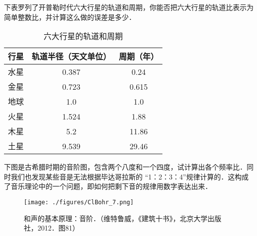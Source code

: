 \begin{exercise}{}
下表罗列了开普勒时代六大行星的轨道和周期，你能否把六大行星的轨道比表示为简单整数比，并计算这么做的误差是多少．

\begin{table}[ht]
\centering
\caption{六大行星的轨道和周期}\label{ClBohr_tab2}
\begin{tabular}{|c|c|c|}
\hline
行星 & 轨道半径（天文单位） & 周期（年） \\
\hline
水星 & 0.387 & 0.24  \\
\hline
金星 & 0.723 & 0.615 \\
\hline
地球 & 1.0 & 1.0 \\
\hline
火星 & 1.524 & 1.88 \\
\hline
木星 & 5.2 & 11.86 \\
\hline
土星 & 9.539 & 29.46 \\
\hline
\end{tabular}
\end{table}
\end{exercise}

\begin{exercise}{}
下图是古希腊时期的音阶图，包含两个八度和一个四度，试计算出各个频率比．同时我们也发现某些音是无法根据毕达哥拉斯的 “1：2：3：4”规律计算的．这构成了音乐理论中的一个问题，即如何把剩下音的规律用数字表达出来．

\begin{figure}[ht]
\centering
\texttt{[image: ./figures/ClBohr\_7.png]}
\caption{和声的基本原理：音阶．（维特鲁威，《建筑十书》，北京大学出版社，2012．图81）} \label{ClBohr_fig7}
\end{figure}
\end{exercise}
